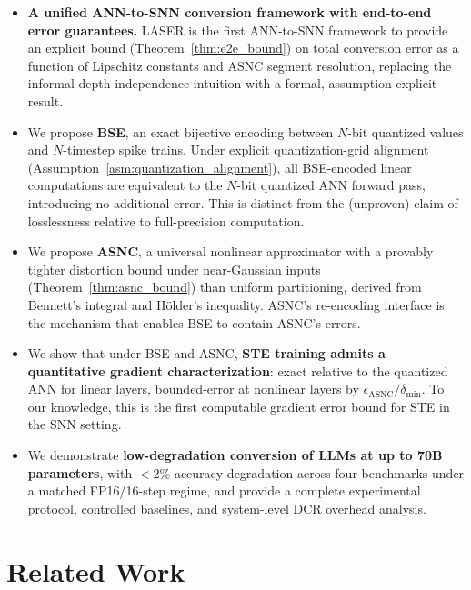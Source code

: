 \documentclass{article}
\theoremstyle{plain}
\theoremstyle{definition}
\theoremstyle{remark}
\begin{document}
\begin{itemize}
  \item \textbf{A unified ANN-to-SNN conversion framework with end-to-end error guarantees.}
        LASER is the first ANN-to-SNN framework to provide an explicit bound
        (Theorem~\ref{thm:e2e_bound}) on total conversion error as a function of
        Lipschitz constants and ASNC segment resolution, replacing the informal
        depth-independence intuition with a formal, assumption-explicit result.

  \item We propose \textbf{BSE}, an exact bijective encoding between $N$-bit quantized
        values and $N$-timestep spike trains. Under explicit quantization-grid alignment
        (Assumption~\ref{asm:quantization_alignment}), all BSE-encoded linear computations
        are equivalent to the $N$-bit quantized ANN forward pass, introducing no
        additional error. This is distinct from the (unproven) claim of losslessness
        relative to full-precision computation.

  \item We propose \textbf{ASNC}, a universal nonlinear approximator with a provably
        tighter distortion bound under near-Gaussian inputs
        (Theorem~\ref{thm:asnc_bound}) than uniform partitioning, derived from
        Bennett's integral and Hölder's inequality. ASNC's re-encoding interface is
        the mechanism that enables BSE to contain ASNC's errors.

  \item We show that under BSE and ASNC, \textbf{STE training admits a quantitative
        gradient characterization}: exact relative to the quantized ANN for linear
        layers, bounded-error at nonlinear layers by $\epsilon_\mathrm{ASNC}/\delta_\mathrm{min}$.
        To our knowledge, this is the first computable gradient error bound for STE
        in the SNN setting.

  \item We demonstrate \textbf{low-degradation conversion of LLMs at up to 70B parameters},
        with $<\!2\%$ accuracy degradation across four benchmarks under a matched
        FP16/16-step regime, and provide a complete experimental protocol, controlled
        baselines, and system-level DCR overhead analysis.
\end{itemize}

\section{Related Work}
\label{sec:related_works}
\end{document}
